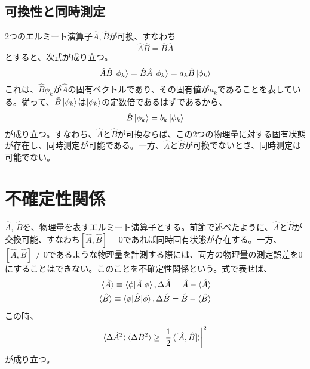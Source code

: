 \subsection{可換性と同時測定}
2つのエルミート演算子$\hat A, \hat B$が可換、すなわち
\begin{equation}
  \hat A \hat B = \hat B \hat A
\end{equation}
とすると、次式が成り立つ。
\begin{equation}
  \hat A \hat B \ket{\phi_k} = \hat B \hat A \ket{\phi_k} = a_k \hat B \ket{\phi_k}
\end{equation}
これは、$\hat B \phi_k$が$\hat A$の固有ベクトルであり、その固有値が$a_k$であることを表している。従って、$\hat B\ket{\phi_k}$は$\ket{\phi_k}$の定数倍であるはずであるから、
\begin{equation}
  \hat B \ket{\phi_k} = b_k \ket{\phi_k}
\end{equation}
が成り立つ。すなわち、$\hat A$と$\hat B$が可換ならば、この2つの物理量に対する固有状態が存在し、同時測定が可能である。一方、$\hat A$と$\hat B$が可換でないとき、同時測定は可能でない。

\section{不確定性関係}
$\hat A$, $\hat B$を、物理量を表すエルミート演算子とする。前節で述べたように、$\hat A$と$\hat B$が交換可能、すなわち$[\hat A, \hat B] = 0$であれば同時固有状態が存在する。一方、$[\hat A, \hat B] \neq 0$であるような物理量を計測する際には、両方の物理量の測定誤差を0にすることはできない。このことを不確定性関係という。式で表せば、
\begin{equation}
\begin{aligned}
  \braket{\hat A} \equiv \braket{\phi|\hat A|\phi}, \Delta \hat A = \hat A - \braket {\hat A}\\
  \braket{\hat B} \equiv \braket{\phi|\hat B|\phi}, \Delta \hat B = \hat B - \braket {\hat B}
\end{aligned}
\end{equation}
この時、
\begin{equation}
  \braket {\Delta \hat A^2}\braket{\Delta \hat B^2} \geq \left| \frac{1}{2} \braket{[\hat A, \hat B]}\right|^2
  \label{eq:uncertainty}
\end{equation}
が成り立つ。

